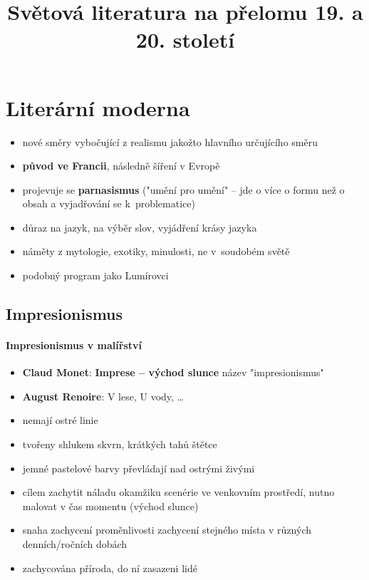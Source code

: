 \title{Světová literatura na přelomu 19. a 20. století}


\section{Literární moderna}
\begin{itemize}
\item nové směry vybočující z realismu jakožto hlavního určujícího směru
\item \textbf{původ ve Francii}, následně šíření v Evropě
\item projevuje se \textbf{parnasismus} ("umění pro umění" -- jde o více o formu než o obsah a vyjadřování se k~problematice)
\item důraz na jazyk, na výběr slov, vyjádření krásy jazyka
\item náměty z mytologie, exotiky, minulosti, ne v~soudobém světě
\item podobný program jako Lumírovci
\end{itemize}

\subsection{Impresionismus}
\paragraph{Impresionismus v malířství}
\begin{itemize}
\item \textbf{Claud Monet}: \textbf{Imprese -- východ slunce} \ra název "impresionismus"
\item \textbf{August Renoire}: V lese, U vody, \ldots
\item nemají ostré linie
\item tvořeny shlukem skvrn, krátkých tahů štětce
\item jemné pastelové barvy převládají nad ostrými živými
\item cílem zachytit náladu okamžiku \ra scenérie ve venkovním prostředí, nutno malovat v čas momentu (východ slunce)
\item snaha zachycení proměnlivosti \ra zachycení stejného místa v různých denních/ročních dobách
\item zachycována příroda, do ní zasazeni lidé
\end{itemize}

